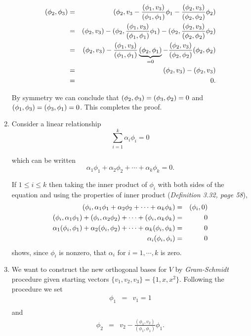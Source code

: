 \begin{solution}
\begin{enumerate}
\begin{eqnarray*}
( {\phi}_2, {\phi}_3) &=& ({ \phi}_2,  { v}_3-\frac{({ \phi}_1, { v}_3)}{({ \phi}_1, { \phi}_1)} { \phi}_1 - \frac{({ \phi}_2, { v}_3)}{({ \phi}_2, { \phi}_2)} { \phi}_2)\\
                         &=&({ \phi}_2, { v}_3)-({\phi}_2 ,\frac{({\phi}_1, { v}_3)}{({ \phi}_1, { \phi}_1)} { \phi}_1) - ({\phi}_2 ,\frac{({\phi}_2, { v}_3)}{({ \phi}_2, { \phi}_2)} { \phi}_2) \\ 
                         &=&({ \phi}_2, { v}_3)- \frac{({ \phi}_1, { v}_3)}{({ \phi}_1, { \phi}_1)} \underbrace{({\phi}_2 ,{ \phi}_1)}_{=0} - \frac{({\phi}_2, { v}_3)}{({ \phi}_2, { \phi}_2)} ({\phi}_2 , { \phi}_2)\\ 
                         &=&({ \phi}_2, { v}_3)-({ \phi}_2, { v}_3)\\
                         &=& 0.                                 
\end{eqnarray*}

By symmetry we can conclude that $ ( {\phi}_2, {\phi}_3)= ( {\phi}_3, {\phi}_2)=0 $ and $ ( {\phi}_1, {\phi}_3)= ( {\phi}_3, {\phi}_1)=0 $. This completes the proof. 
  
\item Consider a linear relationship 
\[
\sum_{i = 1}^k \alpha_i\phi_i = 0
\]

which can be written
\[
\alpha_1\phi_1 + \alpha_2\phi_2+ \cdots + \alpha_k\phi_k =0.
\]

If $ 1 \leq i \leq k$ then taking the inner product of  $\phi_i$  with both sides of the equation and using the properties of inner product (\emph{Definition 3.32, page 58}),
\begin{eqnarray*}
(\phi_i , \alpha_1\phi_1 + \alpha_2\phi_2+ \cdots + \alpha_k\phi_k) &=& ( \phi_i , 0 ) \\
(\phi_i , \alpha_1\phi_1) + ( \phi_i , \alpha_2\phi_2 ) + \cdots + ( \phi_i , \alpha_k\phi_k) &=& 0\\
\alpha_1 (\phi_i , \phi_1) +  \alpha_2 ( \phi_i , \phi_2 ) + \cdots + \alpha_k ( \phi_i , \phi_k) &=& 0\\
\alpha_i (\phi_i , \phi_i) &=& 0
\end{eqnarray*}
shows, since  $\phi_i$ is nonzero, that  $\alpha_i$ for $i=1, \cdots , k$ is zero.

\item We want to construct the new orthogonal bases for $V$ by \emph{Gram-Schmidt} procedure  given starting vectors $\{v_1, v_2, v_3\}=\{1, x, x^2\}$. Following the procedure we set
\begin{eqnarray*}
{ \phi}_1 &=& { v}_1 = 1 \\
\end{eqnarray*}
and 
\begin{eqnarray*}
{ \phi}_2 &=& { v}_2-\frac{({ \phi}_1, { v}_2)}{({ \phi}_1, { \phi}_1)} { \phi}_1.
\end{eqnarray*}


\end{enumerate}
\end{solution}
